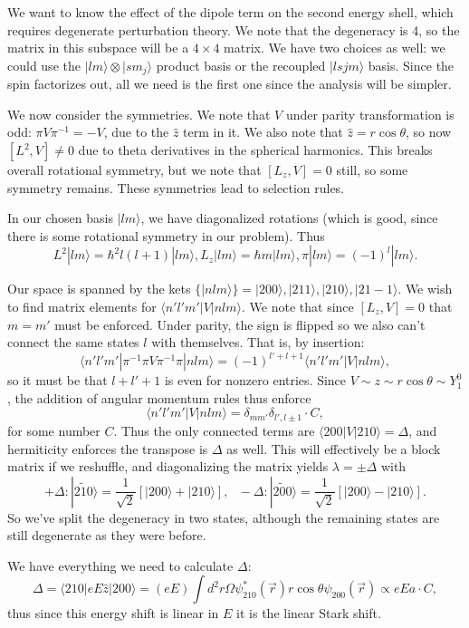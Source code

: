\documentclass[fontsize=12pt]{scrartcl}
\newcommand{\la}{\langle}
\newcommand{\ra}{\rangle}
\begin{document}
We want to know the effect of the dipole term on the second energy shell, which requires degenerate perturbation theory. We note that the degeneracy is 4, so the matrix in this subspace will be a $4\times 4$ matrix. We have two choices as well: we could use the $|lm\ra\otimes|sm_j\ra$ product basis or the recoupled $|lsjm\ra$ basis. Since the spin factorizes out, all we need is the first one since the analysis will be simpler. 

We now consider the symmetries. We note that $V$ under parity transformation is odd: $\pi V\pi^{-1}=-V$, due to the $\hat{z}$ term in it. We also note that $\hat{z}=r\cos\theta$, so now $[L^2,V]\neq 0$ due to theta derivatives in the spherical harmonics. This breaks overall rotational symmetry, but we note that $[L_z,V]=0$ still, so some symmetry remains. These symmetries lead to selection rules.

In our chosen basis $|lm\ra$, we have diagonalized rotations (which is good, since there is some rotational symmetry in our problem). Thus $$L^2|lm\ra = \hbar^2l(l+1)|lm\ra, L_z|lm\ra = \hbar m|lm\ra, \pi|lm\ra = (-1)^l|lm\ra.$$

Our space is spanned by the kets $\{|nlm\ra\}=|200\ra, |211\ra, |210\ra, |21-1\ra$. We wish to find matrix elements for $\la n'l'm'|V|nlm\ra$. We note that since $[L_z,V]=0$ that $m=m'$ must be enforced. Under parity, the sign is flipped so we also can't connect the same states $l$ with themselves. That is, by insertion: $$\la n'l'm'|\pi^{-1}\pi V \pi^{-1}\pi|nlm\ra = (-1)^{l'+l+1}\la n'l'm'|V|nlm\ra,$$ so it must be that $l+l'+1$ is even for nonzero entries. Since $V\sim z\sim r\cos\theta \sim Y_1^0$, the addition of angular momentum rules thus enforce $$\la n'l'm'|V|nlm\ra = \delta_{mm'}\delta_{l', l\pm 1}\cdot C,$$ for some number $C$. Thus the only connected terms are $\la 200|V|210\ra = \Delta$, and hermiticity enforces the transpose is $\Delta$ as well. This will effectively be a block matrix if we reshuffle, and diagonalizing the matrix yields $\lambda=\pm \Delta$ with $$+\Delta: |\tilde{210}\ra = \frac{1}{\sqrt{2}}\left[|200\ra+|210\ra\right], \ \ \ -\Delta: |\tilde{200}\ra = \frac{1}{\sqrt{2}}\left[|200\ra - |210\ra\right].$$ So we've split the degeneracy in two states, although the remaining states are still degenerate as they were before.

We have everything we need to calculate $\Delta$: $$\Delta = \la 210|eE\hat{z}|200\ra = (eE)\int d^2r\Omega \psi_{210}^*(\vec{r})r\cos\theta \psi_{200}(\vec{r})\propto eEa\cdot C,$$ thus since this energy shift is linear in $E$ it is the linear Stark shift.
\end{document}

